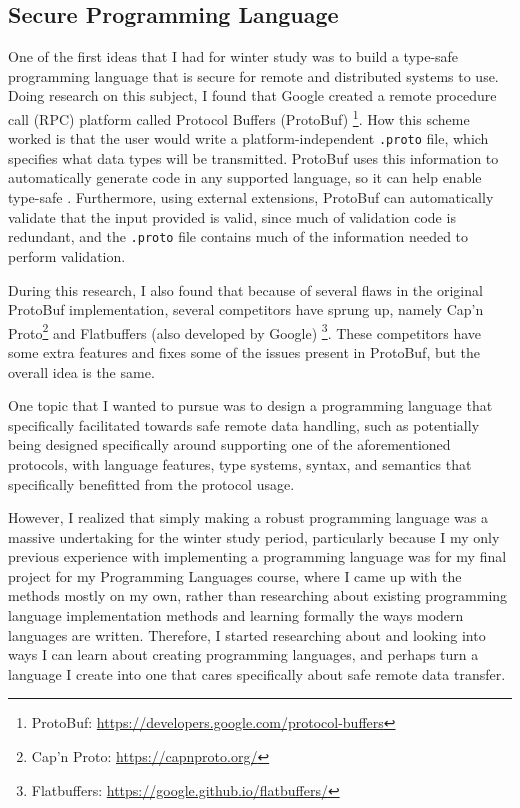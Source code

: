 \documentclass[tikz]{article}
\renewcommand{\:}{\colon}
\begin{document}
\subsection*{Secure Programming Language}
One of the first ideas that I had for winter study was to build a type-safe programming language that is secure for remote and distributed systems to use. Doing research on this subject, I found that Google created a remote procedure call (RPC) platform called Protocol Buffers (ProtoBuf) \footnote{ProtoBuf: \url{https://developers.google.com/protocol-buffers}}. How this scheme worked is that the user would write a platform-independent \texttt{.proto} file, which specifies what data types will be transmitted. ProtoBuf uses this information to automatically generate code in any supported language, so it can help enable type-safe . Furthermore, using external extensions, ProtoBuf can automatically validate that the input provided is valid, since much of validation code is redundant, and the \texttt{.proto} file contains much of the information needed to perform validation.

During this research, I also found that because of several flaws in the original ProtoBuf implementation, several competitors have sprung up, namely Cap'n Proto\footnote{Cap'n Proto: \url{https://capnproto.org/}} and Flatbuffers (also developed by Google) \footnote{Flatbuffers: \url{https://google.github.io/flatbuffers/}}. These competitors have some extra features and fixes some of the issues present in ProtoBuf, but the overall idea is the same.

One topic that I wanted to pursue was to design a programming language that specifically facilitated towards safe remote data handling, such as potentially being designed specifically around supporting one of the aforementioned protocols, with language features, type systems, syntax, and semantics that specifically benefitted from the protocol usage.

However, I realized that simply making a robust programming language was a massive undertaking for the winter study period, particularly because I my only previous experience with implementing a programming language was for my final project for my Programming Languages course, where I came up with the methods mostly on my own, rather than researching about existing programming language implementation methods and learning formally the ways modern languages are written. Therefore, I started researching about and looking into ways I can learn about creating programming languages, and perhaps turn a language I create into one that cares specifically about safe remote data transfer.
\end{document}
